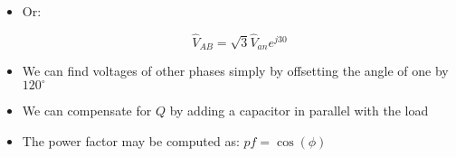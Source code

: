 \begin{itemize}
\begin{itemize}
      \item Or:

        $$\hat{V}_{AB}=\sqrt{3}\hat{V}_{an}e^{j30}$$

      \item We can find voltages of other phases simply by offsetting the angle of one by $120^{\circ}$
        
      \item We can compensate for $Q$ by adding a capacitor in parallel with the load

      \item The power factor may be computed as: $pf=\cos(\phi)$

    \end{itemize}

\end{itemize}



